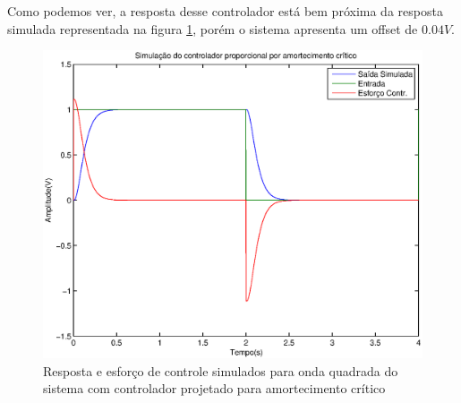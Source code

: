 \documentclass{article}
\begin{document}
Como podemos ver, a resposta desse controlador está bem próxima da resposta simulada representada na figura \ref{fig:simpidc}, porém o sistema apresenta um offset de $0.04 V$.
 \begin{figure}[H]
 	\centering
 	\includegraphics[width=0.8\linewidth]{yusimpidc}
 	\caption{Resposta e esforço de controle simulados para onda quadrada do sistema com controlador projetado para amortecimento crítico}
 	\label{fig:simpidc}
 \end{figure}
  
\end{document}
